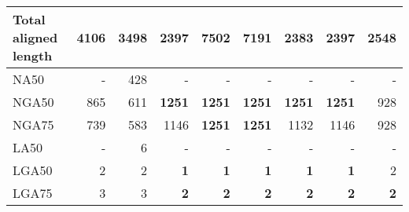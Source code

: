 \documentclass[12pt,a4paper]{article}
\begin{document}
\begin{table}[ht]
\begin{center}
\begin{tabular}{|l*{8}{|r}|}
Total aligned length & 4106 & 3498 & 2397 & {\bf 7502} & 7191 & 2383 & 2397 & 2548 \\ \hline
NA50 & - & 428 & - & - & - & - & - & - \\ \hline
NGA50 & 865 & 611 & {\bf 1251} & {\bf 1251} & {\bf 1251} & {\bf 1251} & {\bf 1251} & 928 \\ \hline
NGA75 & 739 & 583 & 1146 & {\bf 1251} & {\bf 1251} & 1132 & 1146 & 928 \\ \hline
LA50 & - & 6 & - & - & - & - & - & - \\ \hline
LGA50 & 2 & 2 & {\bf 1} & {\bf 1} & {\bf 1} & {\bf 1} & {\bf 1} & 2 \\ \hline
LGA75 & 3 & 3 & {\bf 2} & {\bf 2} & {\bf 2} & {\bf 2} & {\bf 2} & {\bf 2} \\ \hline
\end{tabular}
\end{center}
\end{table}
\end{document}
